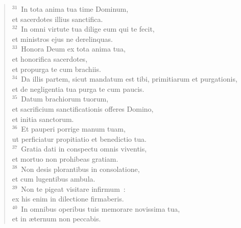 \begin{verse}${}^{31}$~In tota anima tua time Dominum,\\ et sacerdotes illius sanctifica.\\
${}^{32}$~In omni virtute tua dilige eum qui te fecit,\\ et ministros ejus ne derelinquas.\\
${}^{33}$~Honora Deum ex tota anima tua,\\ et honorifica sacerdotes,\\ et propurga te cum brachiis.\\
${}^{34}$~Da illis partem, sicut mandatum est tibi, primitiarum et purgationis,\\ et de negligentia tua purga te cum paucis.\\
${}^{35}$~Datum brachiorum tuorum,\\ et sacrificium sanctificationis offeres Domino,\\ et initia sanctorum.\\
${}^{36}$~Et pauperi porrige manum tuam,\\ ut perficiatur propitiatio et benedictio tua.\\
${}^{37}$~Gratia dati in conspectu omnis viventis,\\ et mortuo non prohibeas gratiam.\\
${}^{38}$~Non desis plorantibus in consolatione,\\ et cum lugentibus ambula.\\
${}^{39}$~Non te pigeat visitare infirmum~:\\ ex his enim in dilectione firmaberis.\\
${}^{40}$~In omnibus operibus tuis memorare novissima tua,\\ et in \ae ternum non peccabis.\end{verse}


